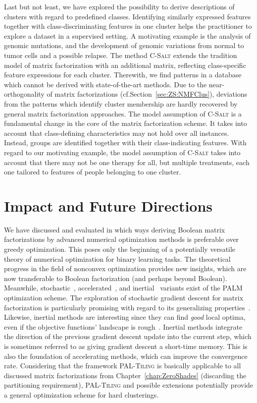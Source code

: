 Last but not least, we have explored the possibility to derive descriptions of clusters with regard to predefined classes. Identifying similarly expressed features together with class-discriminating features in one cluster helps the practitioner to explore a dataset in a supervised setting. A motivating example is the analysis of genomic mutations, and the development of genomic variations from normal to tumor cells and a possible relapse. The method \textsc{C-Salt} extends the tradition model of matrix factorization with an additional matrix, reflecting class-specific feature expressions for each cluster. Therewith, we find patterns in a database which cannot be derived with state-of-the-art methods. Due to the near-orthogonality of matrix factorizations (cf.\@ Section~\ref{sec:ZS:NMFClus}), deviations from the patterns which identify cluster membership are hardly recovered by general matrix factorization approaches. The model assumption of \textsc{C-Salt} is a fundamental change in the core of the matrix factorization scheme. It takes into account that class-defining characteristics may not hold over all instances. Instead, groups are identified together with their class-indicating features. With regard to our motivating example, the model assumption of \textsc{C-Salt} takes into account that there may not be one therapy for all, but multiple treatments, each one tailored to features of people belonging to one cluster.
\section{Impact and Future Directions}
We have discussed and evaluated in which ways deriving Boolean matrix factorizations by advanced numerical optimization methods is preferable over greedy optimization. This poses only the beginning of a potentially versatile theory of numerical optimization for binary learning tasks. The theoretical progress in the field of nonconvex optimization provides new insights, which are now transferable to Boolean factorization (and perhaps beyond Boolean). Meanwhile, stochastic~\citep{davis2016sound}, accelerated~\citep{li2015accelerated}, and inertial~\citep{pock2016inertial} variants exist of the PALM optimization scheme. The exploration of stochastic gradient descent for matrix factorization is particularly promising with regard to its generalizing properties~\citep{hardt2016train,hoffer2017train}. Likewise, inertial methods are interesting since they can find \emph{good} local optima, even if the objective functions' landscape is rough~\citep{goh2017why}. Inertial methods integrate the direction of the previous gradient descent update into the current step, which is sometimes referred to as giving gradient descent a short-time memory. This is also the foundation of accelerating methods, which can improve the convergence rate. Considering that the framework \textsc{PAL-Tiling} is basically applicable to all discussed matrix factorizations from Chapter~\ref{chap:ZeroShades} (discarding the partitioning requirement), \textsc{PAL-Tiling} and possible extensions potentially provide a general optimization scheme for hard clusterings.   

